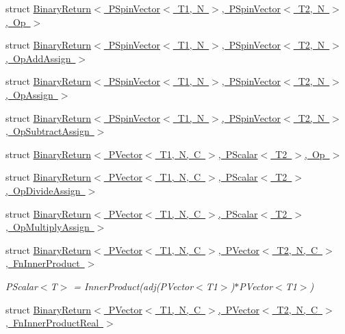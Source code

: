 \begin{DoxyCompactItemize}
struct \mbox{\hyperlink{structENSEM_1_1BinaryReturn_3_01PSpinVector_3_01T1_00_01N_01_4_00_01PSpinVector_3_01T2_00_01N_01_4_00_01Op_01_4}{Binary\+Return$<$ P\+Spin\+Vector$<$ T1, N $>$, P\+Spin\+Vector$<$ T2, N $>$, Op $>$}}
\item 
struct \mbox{\hyperlink{structENSEM_1_1BinaryReturn_3_01PSpinVector_3_01T1_00_01N_01_4_00_01PSpinVector_3_01T2_00_01N_01_4_00_01OpAddAssign_01_4}{Binary\+Return$<$ P\+Spin\+Vector$<$ T1, N $>$, P\+Spin\+Vector$<$ T2, N $>$, Op\+Add\+Assign $>$}}
\item 
struct \mbox{\hyperlink{structENSEM_1_1BinaryReturn_3_01PSpinVector_3_01T1_00_01N_01_4_00_01PSpinVector_3_01T2_00_01N_01_4_00_01OpAssign_01_4}{Binary\+Return$<$ P\+Spin\+Vector$<$ T1, N $>$, P\+Spin\+Vector$<$ T2, N $>$, Op\+Assign $>$}}
\item 
struct \mbox{\hyperlink{structENSEM_1_1BinaryReturn_3_01PSpinVector_3_01T1_00_01N_01_4_00_01PSpinVector_3_01T2_00_01N_01_4_00_01OpSubtractAssign_01_4}{Binary\+Return$<$ P\+Spin\+Vector$<$ T1, N $>$, P\+Spin\+Vector$<$ T2, N $>$, Op\+Subtract\+Assign $>$}}
\item 
struct \mbox{\hyperlink{structENSEM_1_1BinaryReturn_3_01PVector_3_01T1_00_01N_00_01C_01_4_00_01PScalar_3_01T2_01_4_00_01Op_01_4}{Binary\+Return$<$ P\+Vector$<$ T1, N, C $>$, P\+Scalar$<$ T2 $>$, Op $>$}}
\item 
struct \mbox{\hyperlink{structENSEM_1_1BinaryReturn_3_01PVector_3_01T1_00_01N_00_01C_01_4_00_01PScalar_3_01T2_01_4_00_01OpDivideAssign_01_4}{Binary\+Return$<$ P\+Vector$<$ T1, N, C $>$, P\+Scalar$<$ T2 $>$, Op\+Divide\+Assign $>$}}
\item 
struct \mbox{\hyperlink{structENSEM_1_1BinaryReturn_3_01PVector_3_01T1_00_01N_00_01C_01_4_00_01PScalar_3_01T2_01_4_00_01OpMultiplyAssign_01_4}{Binary\+Return$<$ P\+Vector$<$ T1, N, C $>$, P\+Scalar$<$ T2 $>$, Op\+Multiply\+Assign $>$}}
\item 
struct \mbox{\hyperlink{structENSEM_1_1BinaryReturn_3_01PVector_3_01T1_00_01N_00_01C_01_4_00_01PVector_3_01T2_00_01N_00_a7cabe4dbe0fdb804ad141abb1024477}{Binary\+Return$<$ P\+Vector$<$ T1, N, C $>$, P\+Vector$<$ T2, N, C $>$, Fn\+Inner\+Product $>$}}
\begin{DoxyCompactList}\small\item\em P\+Scalar$<$\+T$>$ = Inner\+Product(adj(\+P\+Vector$<$\+T1$>$)$\ast$\+P\+Vector$<$\+T1$>$) \end{DoxyCompactList}\item 
struct \mbox{\hyperlink{structENSEM_1_1BinaryReturn_3_01PVector_3_01T1_00_01N_00_01C_01_4_00_01PVector_3_01T2_00_01N_00_468475cad5ee6c317874aa2dbdb6c752}{Binary\+Return$<$ P\+Vector$<$ T1, N, C $>$, P\+Vector$<$ T2, N, C $>$, Fn\+Inner\+Product\+Real $>$}}

\end{DoxyCompactItemize}
